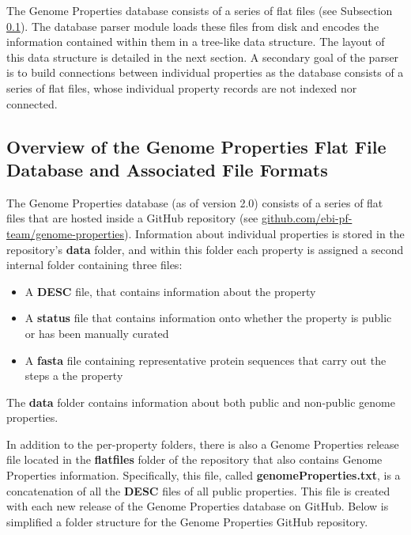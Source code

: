 The Genome Properties database consists of a series of flat files (see 
Subsection \ref{Genome-Properties-Files}). The database parser module loads 
these files from disk and encodes the information contained within them in a 
tree-like data structure. The layout of this data structure is detailed in the 
next section. A secondary goal of the parser is to build connections between 
individual properties as the database consists of a series of flat files, whose 
individual property records are not indexed nor connected. 

\subsection{Overview of the Genome Properties Flat File Database and Associated 
File Formats} \label{Genome-Properties-Files} 

The Genome Properties database (as of version 2.0) consists of a series of flat 
files that are hosted inside a GitHub repository (see 
\href{http://github.com/ebi-pf-team/genome-properties}{github.com/ebi-pf-team/genome-properties}). 
Information about individual properties is stored in the repository's 
\textbf{data} folder, and within this folder each property is assigned a second 
internal folder containing three files: 

\begin{itemize}
\item A \textbf{DESC} file, that contains information about the property
\item A \textbf{status} file that contains information onto whether the property 
is public or has been manually curated
\item A \textbf{\gls{fasta}} \cite{pearson19905} file containing representative 
protein sequences that carry out the steps a the property
\end{itemize}

The \textbf{data} folder contains information about both public and non-public 
genome properties. 

In addition to the per-property folders, there is also a Genome Properties 
release file located in the \textbf{flatfiles} folder of the repository that 
also contains Genome Properties information. Specifically, this file, called 
\textbf{genomeProperties.txt}, is a concatenation of all the \textbf{DESC} files 
of all public properties. This file is created with each new release of the 
Genome Properties database on GitHub. Below is simplified a folder structure for 
the Genome Properties GitHub repository.

